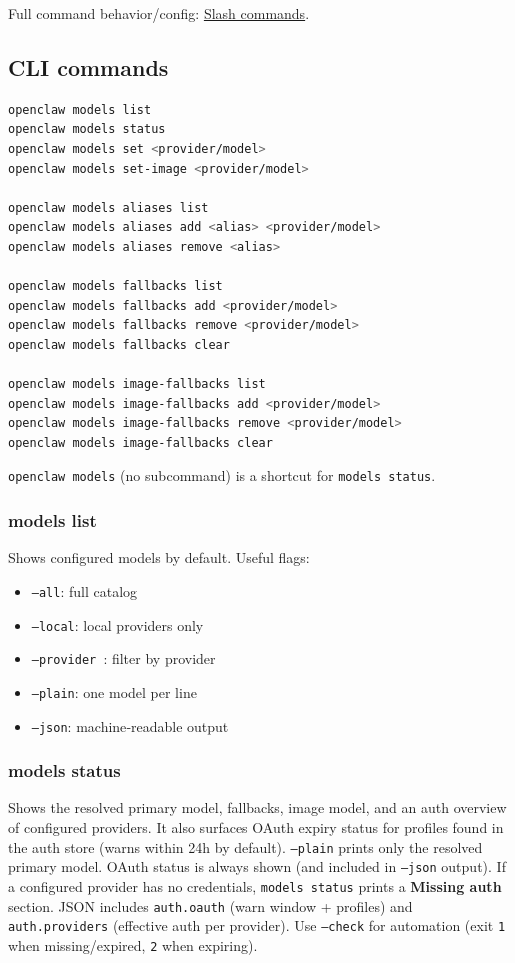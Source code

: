 Full command behavior/config: \href{/tools/slash-commands}{Slash commands}.

\subsection{CLI commands}


\begin{lstlisting}[language=bash]
openclaw models list
openclaw models status
openclaw models set <provider/model>
openclaw models set-image <provider/model>

openclaw models aliases list
openclaw models aliases add <alias> <provider/model>
openclaw models aliases remove <alias>

openclaw models fallbacks list
openclaw models fallbacks add <provider/model>
openclaw models fallbacks remove <provider/model>
openclaw models fallbacks clear

openclaw models image-fallbacks list
openclaw models image-fallbacks add <provider/model>
openclaw models image-fallbacks remove <provider/model>
openclaw models image-fallbacks clear
\end{lstlisting}


\texttt{openclaw models} (no subcommand) is a shortcut for \texttt{models status}.

\subsubsection{models list}


Shows configured models by default. Useful flags:

\begin{itemize}
  \item \texttt{--all}: full catalog
  \item \texttt{--local}: local providers only
  \item \texttt{--provider }: filter by provider
  \item \texttt{--plain}: one model per line
  \item \texttt{--json}: machine‑readable output
\end{itemize}


\subsubsection{models status}


Shows the resolved primary model, fallbacks, image model, and an auth overview
of configured providers. It also surfaces OAuth expiry status for profiles found
in the auth store (warns within 24h by default). \texttt{--plain} prints only the
resolved primary model.
OAuth status is always shown (and included in \texttt{--json} output). If a configured
provider has no credentials, \texttt{models status} prints a \textbf{Missing auth} section.
JSON includes \texttt{auth.oauth} (warn window + profiles) and \texttt{auth.providers}
(effective auth per provider).
Use \texttt{--check} for automation (exit \texttt{1} when missing/expired, \texttt{2} when expiring).

